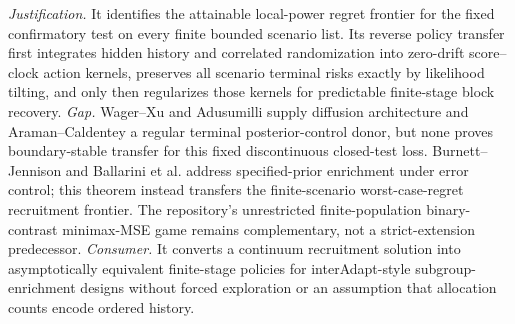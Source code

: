 \documentclass{article}
\begin{document}
\par\smallskip\noindent \textit{Justification.} It identifies the attainable local-power regret frontier for the fixed confirmatory test on every finite bounded scenario list. Its reverse policy transfer first integrates hidden history and correlated randomization into zero-drift score--clock action kernels, preserves all scenario terminal risks exactly by likelihood tilting, and only then regularizes those kernels for predictable finite-stage block recovery. \textit{Gap.} Wager--Xu and Adusumilli supply diffusion architecture and Araman--Caldentey a regular terminal posterior-control donor, but none proves boundary-stable transfer for this fixed discontinuous closed-test loss. Burnett--Jennison and Ballarini et al. address specified-prior enrichment under error control; this theorem instead transfers the finite-scenario worst-case-regret recruitment frontier. The repository's unrestricted finite-population binary-contrast minimax-MSE game remains complementary, not a strict-extension predecessor. \textit{Consumer.} It converts a continuum recruitment solution into asymptotically equivalent finite-stage policies for interAdapt-style subgroup-enrichment designs without forced exploration or an assumption that allocation counts encode ordered history.
\end{document}
